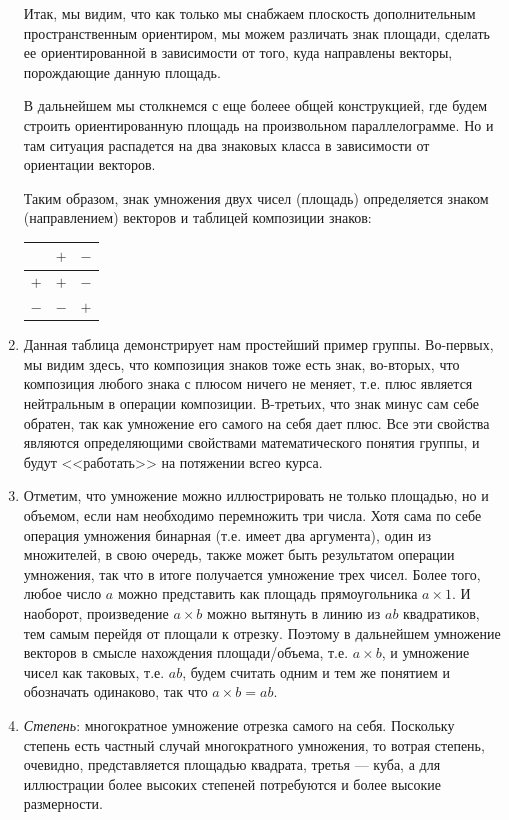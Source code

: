 \begin{enumerate}
Итак, мы видим, что как только мы снабжаем плоскость дополнительным пространственным ориентиром, мы можем различать знак площади, сделать ее ориентированной в зависимости от того, куда направлены векторы, порождающие данную площадь.

В дальнейшем мы столкнемся с еще болеее общей конструкцией, где будем строить ориентированную площадь на произвольном параллелограмме. Но и там ситуация распадется на два знаковых класса в зависимости от ориентации векторов.

Таким образом, знак умножения двух чисел (площадь) определяется знаком (направлением) векторов и таблицей композиции знаков:
\begin{center}
\begin{tabular}{c|c|c|}
  & $+$ & $-$ \\
 \hline
$+$ & $+$ & $-$ \\
 \hline
$-$ & $-$ & $+$ \\
\hline
\end{tabular}
\end{center}
\item Данная таблица демонстрирует нам простейший пример группы. Во-первых, мы видим здесь, что композиция знаков тоже есть знак, во-вторых, что композиция любого знака с плюсом ничего не меняет, т.е. плюс является нейтральным в операции композиции. В-третьих, что знак минус сам себе обратен, так как умножение его самого на себя дает плюс. Все эти свойства являются определяющими свойствами математического понятия группы, и будут <<работать>> на потяжении всгео курса.


\item Отметим, что умножение можно иллюстрировать не только площадью, но и объемом, если нам необходимо перемножить три числа. Хотя сама по себе операция умножения бинарная (т.е. имеет два аргумента), один из множителей, в свою очередь, также может быть результатом операции умножения, так что в итоге получается умножение трех чисел. Более того, любое число $a$ можно представить как площадь прямоугольника $a\times 1$. И наоборот, произведение $a\times b$ можно вытянуть в линию из $ab$ квадратиков, тем самым перейдя от площали к отрезку. Поэтому в дальнейшем умножение векторов в смысле нахождения площади/объема, т.е. $a\times b$, и умножение чисел как таковых, т.е. $ab$, будем считать одним и тем же понятием и обозначать одинаково, так что $a\times b=ab$.

\item \textit{Степень}: многократное умножение отрезка самого на себя. Поскольку степень есть частный случай многократного умножения, то вотрая степень, очевидно, представляется площадью квадрата, третья --- куба, а для иллюстрации более высоких степеней потребуются и более высокие размерности.
\end{enumerate}


